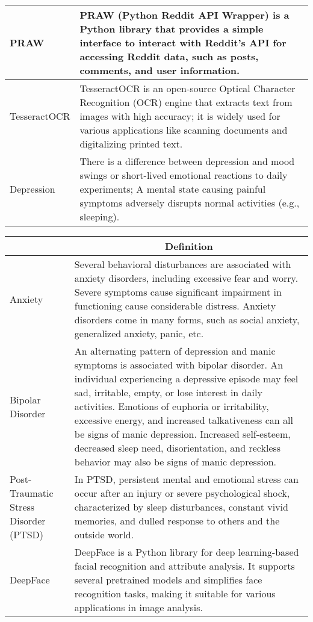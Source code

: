 \begin{center}
\begin{tabular}{|p{4cm}|p{10cm}|}
  \hline
  PRAW & PRAW (Python Reddit API Wrapper) is a Python library that provides a simple interface to interact with Reddit's API for accessing Reddit data, such as posts, comments, and user information. \\
  \hline
  TesseractOCR & TesseractOCR is an open-source Optical Character Recognition (OCR) engine that extracts text from images with high accuracy; it is widely used for various applications like scanning documents and digitalizing printed text. \\
  \hline
  Depression & There is a difference between depression and mood swings or short-lived emotional reactions to daily experiments; A mental state causing painful symptoms adversely disrupts normal activities (e.g., sleeping). \\
  \hline
\end{tabular}

\begin{tabular}{|p{4cm}|p{10cm}|}
    \hline
    \rowcolor{lightestgray}
    \multicolumn{1}{|c|}{\textbf{Term}} & \multicolumn{1}{c|}{\textbf{Definition}} \\

  \hline
  Anxiety & Several behavioral disturbances are associated with anxiety disorders, including excessive fear and worry. Severe symptoms cause significant impairment in functioning cause considerable distress. Anxiety disorders come in many forms, such as social anxiety, generalized anxiety, panic, etc. \\

  \hline
  Bipolar Disorder & An alternating pattern of depression and manic symptoms is associated with bipolar disorder. An individual experiencing a depressive episode may feel sad, irritable, empty, or lose interest in daily activities. Emotions of euphoria or irritability, excessive energy, and increased talkativeness can all be signs of manic depression. Increased self-esteem, decreased sleep need, disorientation, and reckless behavior may also be signs of manic depression. \\

  \hline
  Post-Traumatic Stress Disorder (PTSD) & In PTSD, persistent mental and emotional stress can occur after an injury or severe psychological shock, characterized by sleep disturbances, constant vivid memories, and dulled response to others and the outside world. \\

  \hline
  DeepFace & DeepFace is a Python library for deep learning-based facial recognition and attribute analysis. It supports several pretrained models and simplifies face recognition tasks, making it suitable for various applications in image analysis. \\


\end{tabular}
\end{center}
